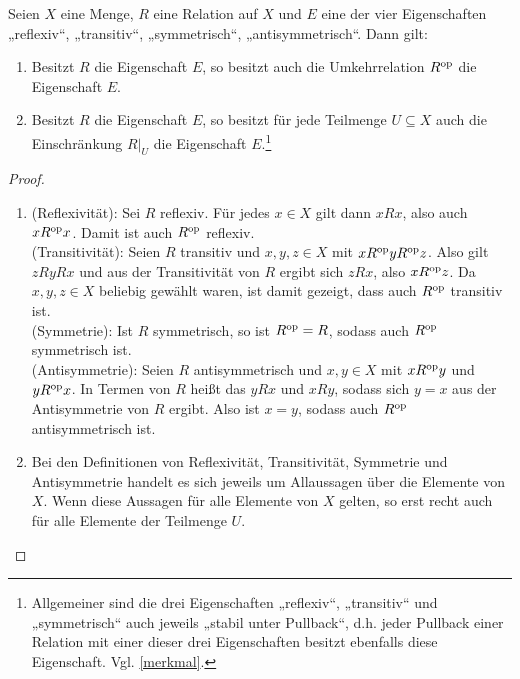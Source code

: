 \begin{satz} \label{releigstabil}
    Seien $X$ eine Menge, $R$ eine Relation auf $X$ und $E$ eine der vier Eigenschaften „reflexiv“, „transitiv“, „symmetrisch“, „antisymmetrisch“. Dann gilt:
    \begin{enumerate}
        \item Besitzt $R$ die Eigenschaft $E$, so besitzt auch die Umkehrrelation $R^{\mathrm{op}}$ die Eigenschaft $E$.
        \item Besitzt $R$ die Eigenschaft $E$, so besitzt für jede Teilmenge $U\subseteq X$ auch die Einschränkung $R\vert_U$ die Eigenschaft $E$.\footnote{Allgemeiner sind die drei Eigenschaften „reflexiv“, „transitiv“ und „symmetrisch“ auch jeweils „stabil unter Pullback“, d.h. jeder Pullback einer Relation mit einer dieser drei Eigenschaften besitzt ebenfalls diese Eigenschaft. Vgl. \cref{merkmal}.}
    \end{enumerate}
\end{satz}
\begin{proof} \quad
    \begin{enumerate}
    \item (Reflexivität): Sei $R$ reflexiv. Für jedes $x\in X$ gilt dann  $xRx$, also auch $xR^{\mathrm{op}} x$. Damit ist auch $R^{\mathrm{op}}$ reflexiv. \\[0.5em]
    (Transitivität): Seien $R$ transitiv und $x,y,z\in X$ mit $xR^{\mathrm{op}} yR^{\mathrm{op}} z$. Also gilt $zRyRx$ und aus der Transitivität von $R$ ergibt sich $zRx$, also $xR^{\mathrm{op}} z$. Da $x,y,z\in X$ beliebig gewählt waren, ist damit gezeigt, dass auch $R^{\mathrm{op}}$ transitiv ist. \\[0.5em]
    (Symmetrie): Ist $R$ symmetrisch, so ist $R^{\mathrm{op}}=R$, sodass auch $R^{\mathrm{op}}$ symmetrisch ist. \\[0.5em]
    (Antisymmetrie): Seien $R$ antisymmetrisch und $x,y\in X$ mit $x R^{\mathrm{op}} y$ und $y R^{\mathrm{op}} x$. In Termen von $R$ heißt das $y Rx$ und $x Ry$, sodass sich $y=x$ aus der Antisymmetrie von $R$ ergibt. Also ist $x=y$, sodass auch $R^{\mathrm{op}}$ antisymmetrisch ist.
    \item Bei den Definitionen von Reflexivität, Transitivität, Symmetrie und Antisymmetrie handelt es sich jeweils um Allaussagen über die Elemente von $X$. Wenn diese Aussagen für alle Elemente von $X$ gelten, so erst recht auch für alle Elemente der Teilmenge $U$. \qedhere
    \end{enumerate}
\end{proof}






